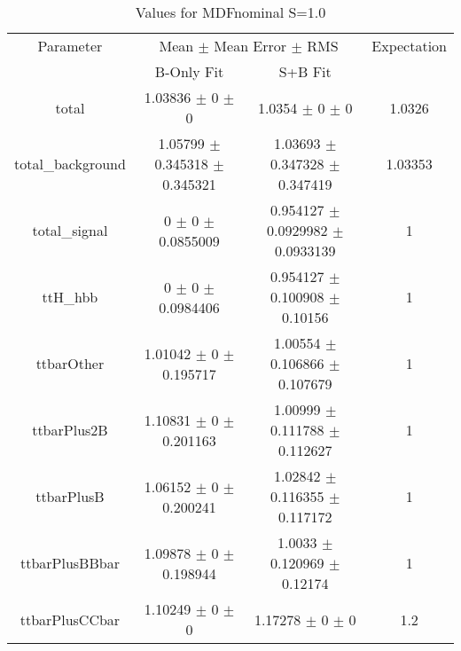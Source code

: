 \begin{table}
\centering
\caption{Values for MDFnominal S=1.0}
\begin{tabular}{cccc}
\toprule
Parameter & \multicolumn{2}{c}{Mean $\pm$ Mean Error $\pm$ RMS} & Expectation\\
 & B-Only Fit & S+B Fit & \\
\midrule
total & \num{1.03836} $\pm$ \num{0} $\pm$ \num{0} & \num{1.0354} $\pm$ \num{0} $\pm$ \num{0} & \num{1.0326}\\
total\_background & \num{1.05799} $\pm$ \num{0.345318} $\pm$ \num{0.345321} & \num{1.03693} $\pm$ \num{0.347328} $\pm$ \num{0.347419} & \num{1.03353}\\
total\_signal & \num{0} $\pm$ \num{0} $\pm$ \num{0.0855009} & \num{0.954127} $\pm$ \num{0.0929982} $\pm$ \num{0.0933139} & \num{1}\\
ttH\_hbb & \num{0} $\pm$ \num{0} $\pm$ \num{0.0984406} & \num{0.954127} $\pm$ \num{0.100908} $\pm$ \num{0.10156} & \num{1}\\
ttbarOther & \num{1.01042} $\pm$ \num{0} $\pm$ \num{0.195717} & \num{1.00554} $\pm$ \num{0.106866} $\pm$ \num{0.107679} & \num{1}\\
ttbarPlus2B & \num{1.10831} $\pm$ \num{0} $\pm$ \num{0.201163} & \num{1.00999} $\pm$ \num{0.111788} $\pm$ \num{0.112627} & \num{1}\\
ttbarPlusB & \num{1.06152} $\pm$ \num{0} $\pm$ \num{0.200241} & \num{1.02842} $\pm$ \num{0.116355} $\pm$ \num{0.117172} & \num{1}\\
ttbarPlusBBbar & \num{1.09878} $\pm$ \num{0} $\pm$ \num{0.198944} & \num{1.0033} $\pm$ \num{0.120969} $\pm$ \num{0.12174} & \num{1}\\
ttbarPlusCCbar & \num{1.10249} $\pm$ \num{0} $\pm$ \num{0} & \num{1.17278} $\pm$ \num{0} $\pm$ \num{0} & \num{1.2}\\
\bottomrule
\end{tabular}
\end{table}